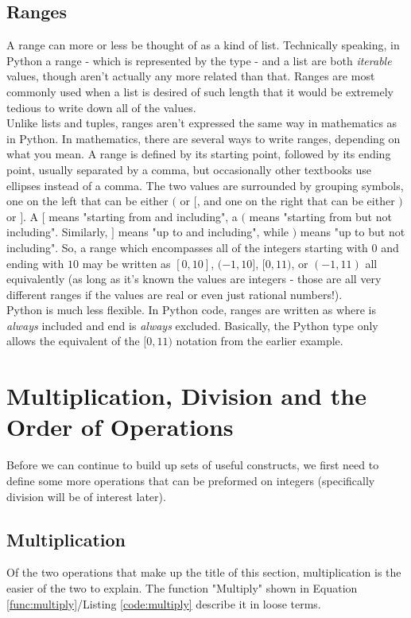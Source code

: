 \subsection{Ranges}
A range can more or less be thought of as a kind of list. Technically speaking, in Python a range - which is represented by the type  - and a list are both \emph{iterable} values, though aren't actually any more related than that. Ranges are most commonly used when a list is desired of such length that it would be extremely tedious to write down all of the values.\\
Unlike lists and tuples, ranges aren't expressed the same way in mathematics as in Python. In mathematics, there are several ways to write ranges, depending on what you mean. A range is defined by its starting point, followed by its ending point, usually separated by a comma, but occasionally other textbooks use ellipses instead of a comma. The two values are surrounded by grouping symbols, one on the left that can be either $($ or $[$, and one on the right that can be either $)$ or $]$. A $[$ means "starting from and including", a $($ means "starting from but not including". Similarly, $]$ means "up to and including", while $)$ means "up to but not including". So, a range which encompasses all of the integers starting with $0$ and ending with $10$ may be written as $[0,10]$, $(-1,10]$, $[0,11)$, or $(-1,11)$ all equivalently (as long as it's known the values are integers - those are all very different ranges if the values are real or even just rational numbers!).\\
Python is much less flexible. In Python code, ranges are written as  where  is \emph{always} included and end is \emph{always} excluded. Basically, the Python  type only allows the equivalent of the $[0,11)$ notation from the earlier example.

\section{Multiplication, Division and the Order of Operations}
Before we can continue to build up sets of useful constructs, we first need to define some more operations that can be preformed on integers (specifically division will be of interest later). \\

\subsection{Multiplication}
Of the two operations that make up the title of this section, multiplication is the easier of the two to explain. The function "Multiply" shown in Equation \ref{func:multiply}/Listing \ref{code:multiply} describe it in loose terms.

